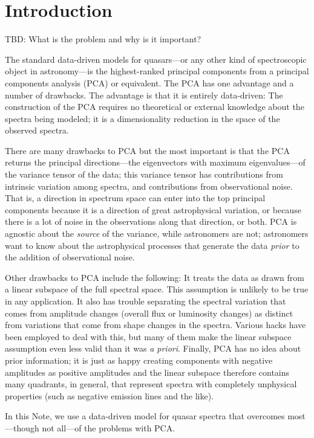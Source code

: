 \documentclass[12pt]{article}
\newcommand{\foreign}[1]{\textsl{#1}}
\begin{document}
\section{Introduction}

TBD: What is the problem and why is it important?

The standard data-driven models for quasars---or any other kind of
spectroscopic object in astronomy---is the highest-ranked principal
components from a principal components analysis (PCA) or equivalent.
The PCA has one advantage and a number of drawbacks.  The advantage is
that it is entirely data-driven: The construction of the PCA requires
no theoretical or external knowledge about the spectra being modeled;
it is a dimensionality reduction in the space of the observed spectra.

There are many drawbacks to PCA but the most important is that the PCA
returns the principal directions---the eigenvectors with maximum
eigenvalues---of the variance tensor of the data; this variance tensor
has contributions from intrinsic variation among spectra, and
contributions from observational noise.  That is, a direction in
spectrum space can enter into the top principal components because it
is a direction of great astrophysical variation, or because there is a
lot of noise in the observations along that direction, or both.  PCA
is agnostic about the \emph{source} of the variance, while astronomers
are not; astronomers want to know about the astrophysical processes
that generate the data \emph{prior} to the addition of observational
noise.

Other drawbacks to PCA include the following: It treats the data as
drawn from a linear subspace of the full spectral space.  This
assumption is unlikely to be true in any application.  It also has
trouble separating the spectral variation that comes from amplitude
changes (overall flux or luminosity changes) as distinct from
variations that come from shape changes in the spectra.  Various hacks
have been employed to deal with this, but many of them make the linear
subspace assumption even less valid than it was \foreign{a priori}.
Finally, PCA has no idea about prior information; it is just as happy
creating components with negative amplitudes as positive amplitudes
and the linear subspace therefore contains many quadrants, in general,
that represent spectra with completely unphysical properties (such as
negative emission lines and the like).

In this Note, we use a data-driven model for quasar spectra
that overcomes most---though not all---of the problems with PCA.
\end{document}
